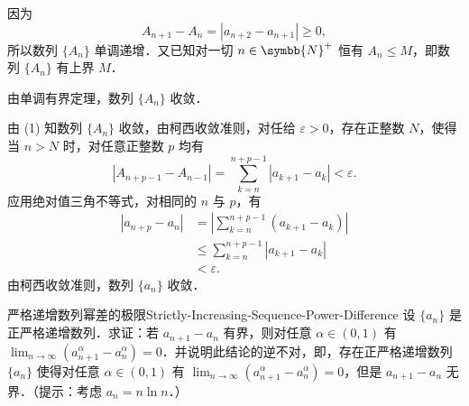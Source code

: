 \begin{myproof}

    因为
    \begin{equation}
        A_{n+1} - A_n = |a_{n+2} - a_{n+1}| \geqslant 0,
    \end{equation}
    所以数列 $\{A_n\}$ 单调递增．又已知对一切 $n \in \symbb{N}^+$ 恒有 $A_n \leqslant M$，即数列 $\{A_n\}$ 有上界 $M$．

    由单调有界定理，数列 $\{A_n\}$ 收敛．


    由 (1) 知数列 $\{A_n\}$ 收敛，由柯西收敛准则，对任给 $\varepsilon > 0$，存在正整数 $N$，使得当 $n > N$ 时，对任意正整数 $p$ 均有
    \begin{equation}
        |A_{n+p-1} - A_{n-1}| = \sum_{k=n}^{n+p-1} |a_{k+1} - a_k| < \varepsilon.
    \end{equation}
    应用绝对值三角不等式，对相同的 $n$ 与 $p$，有
    \begin{equation}
        \begin{aligned}
            |a_{n+p} - a_n| & = \left| \sum_{k=n}^{n+p-1} (a_{k+1} - a_k) \right| \\
                            & \leqslant \sum_{k=n}^{n+p-1} |a_{k+1} - a_k|        \\
                            & < \varepsilon.
        \end{aligned}
    \end{equation}
    由柯西收敛准则，数列 $\{a_n\}$ 收敛．
\end{myproof}

\begin{problem}{严格递增数列幂差的极限}{Strictly-Increasing-Sequence-Power-Difference}
    设 $\{a_n\}$ 是正严格递增数列．求证：若 $a_{n+1} - a_n$ 有界，则对任意 $\alpha \in (0, 1)$ 有 $\lim_{n\to\infty} (a_{n+1}^\alpha - a_n^\alpha) = 0$．并说明此结论的逆不对，即，存在正严格递增数列 $\{a_n\}$ 使得对任意 $\alpha \in (0, 1)$ 有 $\lim_{n\to\infty} (a_{n+1}^\alpha - a_n^\alpha) = 0$，但是 $a_{n+1} - a_n$ 无界．（提示：考虑 $a_n = n \ln n$．）
\end{problem}

